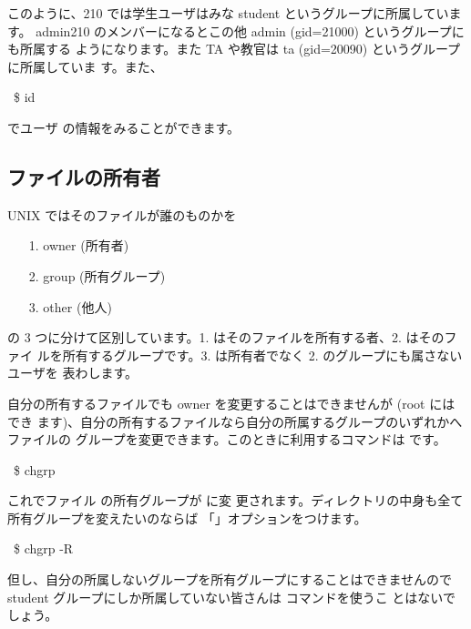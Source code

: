\documentclass[platex]{jsarticle}
\begin{document}
 このように、210 では学生ユーザはみな student というグループに所属しています。
 admin210 のメンバーになるとこの他 admin (gid=21000) というグループにも所属する
 ようになります。また TA や教官は ta (gid=20090) というグループに所属していま
 す。また、
 \begin{terminal}~\$ id \end{terminal}
 でユーザ  の情報をみることができます。

 \subsection{ファイルの所有者}
 UNIX ではそのファイルが誰のものかを
 \begin{enumerate}
  \item[1.] owner (所有者)
  \item[2.] group (所有グループ)
  \item[3.] other (他人)
 \end{enumerate}
 の 3 つに分けて区別しています。1. はそのファイルを所有する者、2. はそのファイ
 ルを所有するグループです。3. は所有者でなく 2. のグループにも属さないユーザを
 表わします。

 自分の所有するファイルでも owner を変更することはできませんが (root にはでき
 ます)、自分の所有するファイルなら自分の所属するグループのいずれかへファイルの
 グループを変更できます。このときに利用するコマンドは  です。
 \begin{terminal}%
~\$ chgrp  
\end{terminal}
 これでファイル  の所有グループが  に変
 更されます。ディレクトリの中身も全て所有グループを変えたいのならば
 「」オプションをつけます。
 \begin{terminal}%
~\$ chgrp -R  
\end{terminal}
 但し、自分の所属しないグループを所有グループにすることはできませんので
 student グループにしか所属していない皆さんは  コマンドを使うこ
 とはないでしょう。
\end{document}
